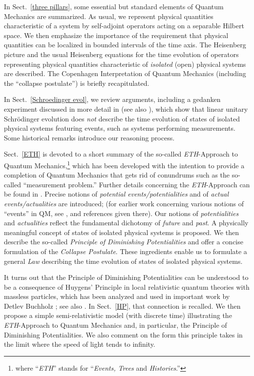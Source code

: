 \documentclass[12pt]{article}
\begin{document}
In Sect.~\ref{three pillars}, some essential but standard elements of Quantum Mechanics are summarized. 
As usual, we represent physical quantities characteristic of a system by self-adjoint operators acting on a separable Hilbert 
space. We then emphasize the importance of the requirement that physical quantities can be localized in bounded intervals 
of the time axis. The Heisenberg picture and the usual Heisenberg equations for the time evolution of operators representing 
physical quantities characteristic of \textit{isolated} (open) physical systems are described. The Copenhagen Interpretation 
of Quantum Mechanics (including the ``collapse postulate'') is briefly recapitulated.

In Sect.~\ref{Schroedinger evol}, we review arguments, including a gedanken experiment discussed in more detail in 
\cite{FFS} (see also \cite{Schill}), which show that linear unitary Schr\"odinger evolution does \textit{not} describe the 
time evolution of states of isolated physical systems featuring events, such as systems performing measurements. Some historical remarks introduce our reasoning process.

Sect.~\ref{ETH} is devoted to a short summary of the so-called \textit{ETH}-Approach to Quantum Mechanics,\footnote{where 
``\textit{ETH}'' stands for ``\textit{Events, Trees} and \textit{Histories}.''}  which has 
been developed with the intention to provide a completion of Quantum Mechanics that gets rid of conundrums such 
as the so-called ``measurement problem.'' Further details concerning the \textit{ETH}-Approach can be found in 
\cite{F-Schub, BFS, Fr1, LMU-19, Fr2}. Precise notions of \textit{potential events/potentialities} and of 
\textit{actual events/actualities} are introduced; (for earlier work concerning various notions of ``events'' in QM, see 
\cite{Rudolf, Blanchard}, and references given there). Our notions of \textit{potentialities} and \textit{actualities} reflect the 
fundamental dichotomy of \textit{future} and \textit{past}. A physically meaningful concept of states of isolated physical 
systems is proposed. We then describe the so-called \textit{Principle of Diminishing Potentialities} and offer a concise 
formulation of the \textit{Collapse Postulate}. These ingredients enable us to formulate a general \textit{Law} describing 
the time evolution of states of isolated physical systems.

It turns out that the Principle of Diminishing Potentialities can be understood to be a consequence of Huygens' Principle in 
local relativistic quantum theories with massless particles, which has been analyzed and used in important work by 
{Detlev Buchholz} \cite{Buchholz}; see also \cite{BRob}. In Sect.~\ref{HP}, that connection is recalled. We then propose 
a simple semi-relativistic model (with discrete time) illustrating the \textit{ETH}-Approach to Quantum Mechanics and, 
in particular, the Principle of Diminishing Potentialities. We also comment on the form this principle takes in the limit 
where the speed of light tends to infinity.
\end{document}
